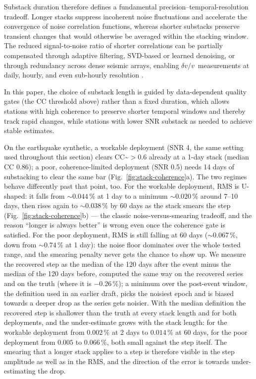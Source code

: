 \documentclass[
  referee]{gji}
\providecommand{\dvv}{\ensuremath{\delta v/v}}
\begin{document}
Substack duration therefore defines a fundamental
precision--temporal-resolution tradeoff. Longer stacks suppress
incoherent noise fluctuations and accelerate the convergence of noise
correlation functions, whereas shorter substacks preserve transient
changes that would otherwise be averaged within the stacking window. The
reduced signal-to-noise ratio of shorter correlations can be partially
compensated through adaptive filtering, SVD-based or learned denoising,
or through redundancy across dense seismic arrays, enabling
\dvv~measurements at daily, hourly, and even sub-hourly resolution
\citep[\citet{Moreau2017},\citet{Mao2019},\citet{Viens2020}]{Hadziioannou2011}.

In this paper, the choice of substack length is guided by data-dependent
quality gates (the CC threshold above) rather than a fixed duration,
which allows stations with high coherence to preserve shorter temporal
windows and thereby track rapid changes, while stations with lower SNR
substack as needed to achieve stable estimates.

On the earthquake synthetic, a workable deployment (SNR 4, the same
setting used throughout this section) clears CC\textasciitilde{}\(>0.6\)
already at a 1-day stack (median CC 0.86); a poor, coherence-limited
deployment (SNR 0.5) needs 14 days of substacking to clear the same bar
(Fig.~\ref{fig:stack-coherence}a). The two regimes behave differently
past that point, too. For the workable deployment, RMS is U-shaped: it
falls from \(\sim\!0.044\,\%\) at 1 day to a minimum \(\sim\!0.020\,\%\)
around 7--10 days, then rises again to \(\sim\!0.038\,\%\) by 60 days as
the stack smears the step (Fig.~\ref{fig:stack-coherence}b) --- the
classic noise-versus-smearing tradeoff, and the reason ``longer is
always better'' is wrong even once the coherence gate is satisfied. For
the poor deployment, RMS is still falling at 60 days
(\(\sim\!0.067\,\%\), down from \(\sim\!0.74\,\%\) at 1 day): the noise
floor dominates over the whole tested range, and the smearing penalty
never gets the chance to show up. We measure the recovered step as the
median of the 120 days after the event minus the median of the 120 days
before, computed the same way on the recovered series and on the truth
(where it is \(-0.26\,\%\)); a minimum over the post-event window, the
definition used in an earlier draft, picks the noisiest epoch and is
biased towards a deeper drop as the series gets noisier. With the median
definition the recovered step is shallower than the truth at every stack
length and for both deployments, and the under-estimate grows with the
stack length: for the workable deployment from \(0.002\,\%\) at 2 days
to \(0.014\,\%\) at 60 days, for the poor deployment from \(0.005\) to
\(0.066\,\%\), both small against the step itself. The smearing that a
longer stack applies to a step is therefore visible in the step
amplitude as well as in the RMS, and the direction of the error is
towards under-estimating the drop.
\end{document}

